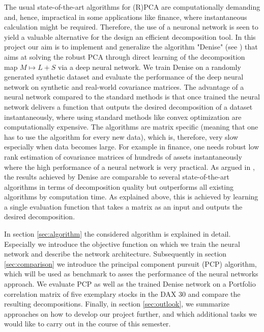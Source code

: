 The usual state-of-the-art algorithms for (R)PCA are computationally demanding and, hence, impractical in some applications like finance, where instantaneous calculation might be required. Therefore, the use of a neuronal network is seen to yield a valuable alternative for the design an efficient decomposition tool. In this project our aim is to implement and generalize the algorithm "Denise" (see \cite{herrera2020denise}) that aims at solving the robust PCA through direct learning of the decomposition map $M\mapsto L+S$ via a deep neural network. We train Denise on a randomly generated synthetic dataset and evaluate the performance of the deep neural network on synthetic and real-world covariance matrices. The advantage of a neural network compared to the standard methods is that once trained the neural network delivers a function that outputs the desired decomposition of a dataset instantaneously, where using standard methods like convex optimization are computationally expensive. The algorithms are matrix specific (meaning that one has to use the algorithm for every new data), which is, therefore, very slow especially when data becomes large. For example in finance, one needs robust low rank estimation of covariance matrices of hundreds of assets instantaneously where the high performance of a neural network is very practical. As argued in \cite{herrera2020denise}, the results achieved by Denise are comparable to several state-of-the-art algorithms in terms of decomposition quality but outperforms all existing algorithms by computation time. As explained above, this is achieved by learning a single evaluation function that takes a matrix as an input and outputs the desired decomposition.

In section \ref{sec:algorithm} the considered algorithm is explained in detail. Especially we introduce the objective function on which we train the neural network and describe the network architecture. Subsequently in section \ref{sec:comparison} we introduce the principal component pursuit (PCP) algorithm, which will be used as benchmark to asses the performance of the neural networks approach. We evaluate PCP as well as the trained Denise network on a Portfolio correlation matrix of five exemplary stocks in the DAX 30 and compare the resulting decompositions. Finally, in section \ref{sec:outlook}, we summarize approaches on how to develop our project further, and which additional tasks we would like to carry out in the course of this semester.






